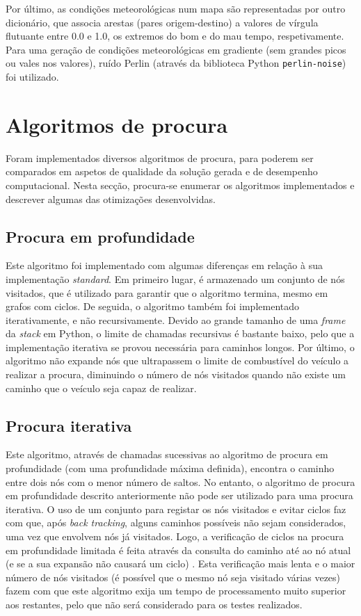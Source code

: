 \documentclass[12pt, a4paper]{article}
\begin{document}
Por último, as condições meteorológicas num mapa são representadas por outro dicionário, que associa
arestas (pares origem-destino) a valores de vírgula flutuante entre 0.0 e 1.0, os extremos do bom e
do mau tempo, respetivamente. Para uma geração de condições meteorológicas em gradiente (sem grandes
picos ou vales nos valores), ruído Perlin (através da biblioteca Python \texttt{perlin-noise}) foi
utilizado.

\section{Algoritmos de procura}

Foram implementados diversos algoritmos de procura, para poderem ser comparados em aspetos de
qualidade da solução gerada e de desempenho computacional. Nesta secção, procura-se enumerar os
algoritmos implementados e descrever algumas das otimizações desenvolvidas.

\subsection{Procura em profundidade}

Este algoritmo foi implementado com algumas diferenças em relação à sua implementação
\emph{standard}. Em primeiro lugar, é armazenado um conjunto de nós visitados, que é utilizado para
garantir que o algoritmo termina, mesmo em grafos com ciclos. De seguida, o algoritmo também foi
implementado iterativamente, e não recursivamente. Devido ao grande tamanho de uma \emph{frame} da
\emph{stack} em Python, o limite de chamadas recursivas é bastante baixo, pelo que a implementação
iterativa se provou necessária para caminhos longos. Por último, o algoritmo não expande nós que
ultrapassem o limite de combustível do veículo a realizar a procura, diminuindo o número de nós
visitados quando não existe um caminho que o veículo seja capaz de realizar.

\subsection{Procura iterativa}

Este algoritmo, através de chamadas sucessivas ao algoritmo de procura em profundidade (com uma
profundidade máxima definida), encontra o caminho entre dois nós com o menor número de saltos. No
entanto, o algoritmo de procura em profundidade descrito anteriormente não pode ser utilizado para
uma procura iterativa. O uso de um conjunto para registar os nós visitados e evitar ciclos faz com
que, após \emph{back tracking}, alguns caminhos possíveis não sejam considerados, uma vez que
envolvem nós já visitados. Logo, a verificação de ciclos na procura em profundidade limitada é feita
através da consulta do caminho até ao nó atual (e se a sua expansão não causará um ciclo)
\cite{aima}. Esta verificação mais lenta e o maior número de nós visitados (é possível que o mesmo
nó seja visitado várias vezes) fazem com que este algoritmo exija um tempo de processamento muito
superior aos restantes, pelo que não será considerado para os testes realizados.
\end{document}
